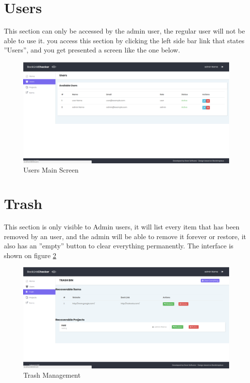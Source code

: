 \section{Users}
This section can only be accessed by the admin user, the regular user will not be able to use it. you access this section by clicking the left side bar link that states ''Users'', and you get presented a screen like the one below.
\begin{figure}[H]
	\caption{Users Main Screen}
	\label{img:usrmain}
	\includegraphics[width=\textwidth]{images/users_screenshot}
\end{figure}

\section{Trash}
This section is only visible to Admin users, it will list every item that has been removed by an user, and the admin will be able to remove it forever or restore, it also has an ''empty'' button to clear everything permanently. 
The interface is shown on figure \ref{img:trash}

\begin{figure}[H]
	\caption{Trash Management}
	\label{img:trash}
	\includegraphics[width=\textwidth]{images/trash_manage.png}
\end{figure}
